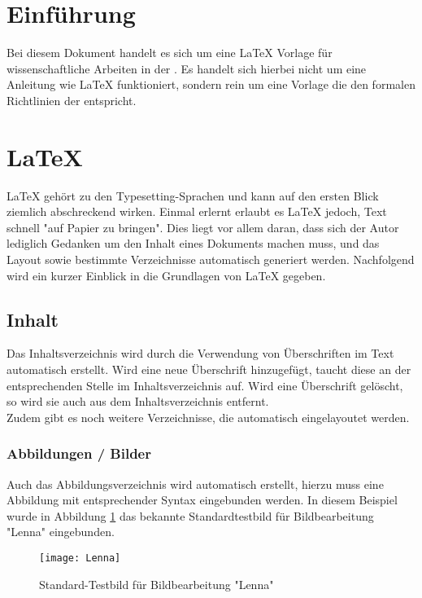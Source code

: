 \section{Einführung}
\label{sec:einfuehrung}

Bei diesem Dokument handelt es sich um eine \LaTeX{} Vorlage für wissenschaftliche Arbeiten in der . Es handelt sich hierbei nicht um eine Anleitung wie \LaTeX{} funktioniert, sondern rein um eine Vorlage die den formalen Richtlinien der  entspricht.

\newpage
\section{\LaTeX}

\LaTeX{} gehört zu den Typesetting-Sprachen und kann auf den ersten Blick ziemlich abschreckend wirken.
Einmal erlernt erlaubt es \LaTeX{} jedoch, Text schnell "auf Papier zu bringen". Dies liegt vor allem daran,
dass sich der Autor lediglich Gedanken um den Inhalt eines Dokuments machen muss, und das Layout sowie
bestimmte Verzeichnisse automatisch generiert werden. Nachfolgend wird ein kurzer Einblick in die Grundlagen
von \LaTeX{} gegeben.

\subsection{Inhalt}

Das Inhaltsverzeichnis wird durch die Verwendung von Überschriften im Text automatisch erstellt.
Wird eine neue Überschrift hinzugefügt, taucht diese an der entsprechenden Stelle im Inhaltsverzeichnis auf.
Wird eine Überschrift gelöscht, so wird sie auch aus dem Inhaltsverzeichnis entfernt. \\

Zudem gibt es noch weitere Verzeichnisse, die automatisch eingelayoutet werden.

\subsubsection{Abbildungen / Bilder}

Auch das Abbildungsverzeichnis wird automatisch erstellt, hierzu muss eine Abbildung mit
entsprechender Syntax eingebunden werden. In diesem Beispiel wurde in Abbildung
\ref{fig: Lenna} das bekannte Standardtestbild für Bildbearbeitung "Lenna" eingebunden.

\begin{figure}[H]
  \centering
  \texttt{[image: Lenna]}
  \caption{Standard-Testbild für Bildbearbeitung "Lenna"}
  \label{fig: Lenna}
\end{figure}

